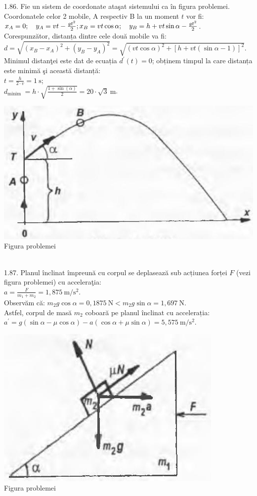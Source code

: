 1.86. Fie un sistem de coordonate ataşat sistemului ca în figura problemei. Coordonatele celor 2 mobile, A respectiv B la un moment $t$ vor fi:\\ $x_{A}=0; \quad y_{A}=v t-\frac{g t^{2}}{2};\\ x_{B}=v t \cos \alpha; \quad y_{B}=h+v t \sin \alpha-\frac{g t^{2}}{2}$.\\ Corespunzător, distanța dintre cele două mobile va fi:\\ $d=\sqrt{\left(x_{B}-x_{A}\right)^{2}+\left(y_{B}-y_{A}\right)^{2}}=\sqrt{(v t \cos \alpha)^{2}+[h+v t(\sin \alpha-1)]^{2}}$.\\ Minimul distanţei este dat de ecuația $d^{\prime}(t)=0$; obținem timpul la care distanța este minimă şi această distanță:\\ $t=\frac{h}{2 \cdot v}=1 \mathrm{~s}$;\\ $d_{\text {minim }}=h \cdot \sqrt{\frac{1+\sin (\alpha)}{2}}=20 \cdot \sqrt{3} \mathrm{~m}$.\\ \begin{center} \includegraphics[width=0.4\linewidth]{images/2025_07_01_5b3ff9fa0d508c8e9f17g-214(1)}\\ Figura problemei \end{center}\\

1.87. Planul înclinat împreună cu corpul se deplasează sub acțiunea forței $F$ (vezi figura problemei) cu acceleraţia:\\ $a=\frac{F}{m_{1}+m_{2}}=1,875 \mathrm{~m} / \mathrm{s}^{2}$.\\ Observăm că: $m_{2} g \cos \alpha=0,1875 \mathrm{~N}<m_{2} g \sin \alpha=1,697 \mathrm{~N}$.\\ Astfel, corpul de masă $m_{2}$ coboară pe planul înclinat cu accelerația:\\ $a^{\prime}=g(\sin \alpha-\mu \cos \alpha)-a(\cos \alpha+\mu \sin \alpha)=5,575 \mathrm{~m} / \mathrm{s}^{2}$.\\ \begin{center} \includegraphics[width=0.4\linewidth]{images/2025_07_01_5b3ff9fa0d508c8e9f17g-214}\\ Figura problemei \end{center}\\ 

